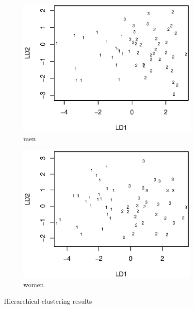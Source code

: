 \documentclass{article}
\begin{document}
\begin{itemize}[leftmargin = 0 em]
\begin{figure}[!htb]
          \begin{subfigure}[b]{0.5\linewidth}
            \centering
            \includegraphics[width = \textwidth]{men_hc.eps}
            \caption{men}
          \end{subfigure}%
          \begin{subfigure}[b]{0.5\linewidth}
            \centering
            \includegraphics[width = \textwidth]{women_hc.eps}
            \caption{women}
          \end{subfigure}
          \caption{Hierarchical clustering results}
          \label{hc}
\end{figure}



\end{itemize}
\end{document}
